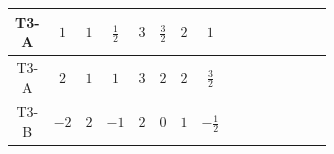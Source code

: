 \documentclass[8pt]{article}
\begin{document}
\begin{landscape}
\begin{longtable}{@{}cccccccc >{\raggedright\arraybackslash}p{0.21\linewidth} >{\raggedright\arraybackslash}p{0.21\linewidth} >{\raggedright\arraybackslash}p{0.21\linewidth}@{}}
\midrule
T3-A & $1$ & $1$ & $\frac{1}{2}$ & $3$ & $\frac{3}{2}$ & $2$ & $1$ & \scriptsize\adjustbox{max width=\linewidth}{$\begin{gathered} +D_{\mu _1}\left(S_{2,j_1}\right){}^{\dagger } D_{\mu _1}\left(S_{2,j_1}\right)\end{gathered}$} & \scriptsize\adjustbox{max width=\linewidth}{$\begin{gathered} -\overline{F_{j_1,r_1}}\, F_{j_1,r_1} M_F\end{gathered}$} & \scriptsize\adjustbox{max width=\linewidth}{$\begin{gathered} +i \overline{F_{j_1,r_1}}\, \gamma ^{\mu _1}\, D_{\mu _1}\left(F_{j_1,r_1}\right)\end{gathered}$} \\
\midrule
T3-A & $2$ & $1$ & $1$ & $3$ & $2$ & $2$ & $\frac{3}{2}$ & \scriptsize\adjustbox{max width=\linewidth}{$\begin{gathered} +D_{\mu _1}\left(S_{2,j_1}\right){}^{\dagger } D_{\mu _1}\left(S_{2,j_1}\right)\end{gathered}$} & \scriptsize\adjustbox{max width=\linewidth}{$\begin{gathered} -\overline{F_{j_1,r_1}}\, F_{j_1,r_1} M_F\end{gathered}$} & \scriptsize\adjustbox{max width=\linewidth}{$\begin{gathered} +i \overline{F_{j_1,r_1}}\, \gamma ^{\mu _1}\, D_{\mu _1}\left(F_{j_1,r_1}\right)\end{gathered}$} \\
\midrule
T3-B & $-2$ & $2$ & $-1$ & $2$ & $0$ & $1$ & $-\frac{1}{2}$ & \scriptsize\adjustbox{max width=\linewidth}{$\begin{gathered} +D_{\mu _1}\left(S_{2,j_1}\right){}^{\dagger } D_{\mu _1}\left(S_{2,j_1}\right)\end{gathered}$} & \scriptsize\adjustbox{max width=\linewidth}{$\begin{gathered} -\overline{F_{r_1}}\, F_{r_1} M_F\end{gathered}$} & \scriptsize\adjustbox{max width=\linewidth}{$\begin{gathered} +i \overline{F_{r_1}}\, \gamma ^{\mu _1}\, D_{\mu _1}\left(F_{r_1}\right)\end{gathered}$} \\
\midrule

\end{longtable}
\end{landscape}
\end{document}
